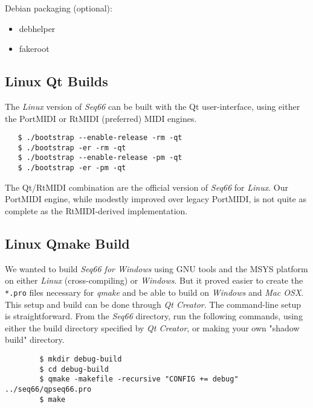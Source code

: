    Debian packaging (optional):

     \begin{itemize}
        \item debhelper
        \item fakeroot
     \end{itemize}

\subsection{Linux Qt Builds}
\label{subsec:build_Qt}

   The \textsl{Linux} version of \textsl{Seq66} can be built with the Qt
   user-interface, using either the PortMIDI or RtMIDI (preferred) MIDI
   engines.
 
\begin{verbatim}
   $ ./bootstrap --enable-release -rm -qt
   $ ./bootstrap -er -rm -qt
   $ ./bootstrap --enable-release -pm -qt
   $ ./bootstrap -er -pm -qt
\end{verbatim}

   The Qt/RtMIDI combination are the official version
   of \textsl{Seq66} for \textsl{Linux}.
   Our PortMIDI engine, while modestly improved over legacy PortMIDI, is not
   quite as complete as the RtMIDI-derived implementation.

\subsection{Linux Qmake Build}
\label{subsec:build_qmake}

   We wanted to build \textsl{Seq66 for Windows} using GNU tools and the
   MSYS platform on either \textsl{Linux} (cross-compiling) or
   \textsl{Windows}.  But it proved easier to create the
   \texttt{*.pro} files necessary for \textsl{qmake} and be able to build
   on \textsl{Windows} and \textsl{Mac OSX}.
   This setup and build can be done through \textsl{Qt Creator}.
   The command-line setup is straightforward.
   From the \textsl{Seq66} directory, run the following
   commands, using either the build directory specified by \textsl{Qt Creator},
   or making your own "shadow build" directory.

   \begin{verbatim}
        $ mkdir debug-build
        $ cd debug-build
        $ qmake -makefile -recursive "CONFIG += debug" ../seq66/qpseq66.pro
        $ make
   \end{verbatim}

